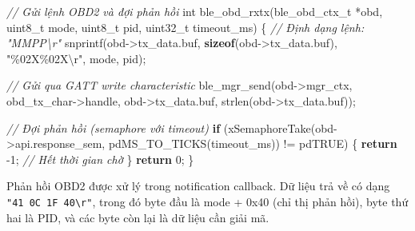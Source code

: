 \documentclass[a4paper]{extarticle}
\newenvironment{Shaded}{}{}
\newcommand{\CommentTok}[1]{\textcolor[rgb]{0.38,0.63,0.69}{\textit{#1}}}
\newcommand{\ControlFlowTok}[1]{\textcolor[rgb]{0.00,0.44,0.13}{\textbf{#1}}}
\newcommand{\DataTypeTok}[1]{\textcolor[rgb]{0.56,0.13,0.00}{#1}}
\newcommand{\DecValTok}[1]{\textcolor[rgb]{0.25,0.63,0.44}{#1}}
\newcommand{\KeywordTok}[1]{\textcolor[rgb]{0.00,0.44,0.13}{\textbf{#1}}}
\newcommand{\NormalTok}[1]{#1}
\newcommand{\OperatorTok}[1]{\textcolor[rgb]{0.40,0.40,0.40}{#1}}
\newcommand{\SpecialCharTok}[1]{\textcolor[rgb]{0.25,0.44,0.63}{#1}}
\newcommand{\StringTok}[1]{\textcolor[rgb]{0.25,0.44,0.63}{#1}}
\begin{document}
\begin{Shaded}
\begin{Highlighting}[]
\CommentTok{// Gửi lệnh OBD2 và đợi phản hồi}
\DataTypeTok{int}\NormalTok{ ble\_obd\_rxtx}\OperatorTok{(}\NormalTok{ble\_obd\_ctx\_t }\OperatorTok{*}\NormalTok{obd}\OperatorTok{,} \DataTypeTok{uint8\_t}\NormalTok{ mode}\OperatorTok{,} \DataTypeTok{uint8\_t}\NormalTok{ pid}\OperatorTok{,}
                 \DataTypeTok{uint32\_t}\NormalTok{ timeout\_ms}\OperatorTok{)}
\OperatorTok{\{}
    \CommentTok{// Định dạng lệnh: "MMPP\textbackslash{}r"}
\NormalTok{    snprintf}\OperatorTok{(}\NormalTok{obd}\OperatorTok{{-}\textgreater{}}\NormalTok{tx\_data}\OperatorTok{.}\NormalTok{buf}\OperatorTok{,} \KeywordTok{sizeof}\OperatorTok{(}\NormalTok{obd}\OperatorTok{{-}\textgreater{}}\NormalTok{tx\_data}\OperatorTok{.}\NormalTok{buf}\OperatorTok{),}
             \StringTok{"}\SpecialCharTok{\%02X\%02X\textbackslash{}r}\StringTok{"}\OperatorTok{,}\NormalTok{ mode}\OperatorTok{,}\NormalTok{ pid}\OperatorTok{);}

    \CommentTok{// Gửi qua GATT write characteristic}
\NormalTok{    ble\_mgr\_send}\OperatorTok{(}\NormalTok{obd}\OperatorTok{{-}\textgreater{}}\NormalTok{mgr\_ctx}\OperatorTok{,}\NormalTok{ obd\_tx\_char}\OperatorTok{{-}\textgreater{}}\NormalTok{handle}\OperatorTok{,}
\NormalTok{                 obd}\OperatorTok{{-}\textgreater{}}\NormalTok{tx\_data}\OperatorTok{.}\NormalTok{buf}\OperatorTok{,}\NormalTok{ strlen}\OperatorTok{(}\NormalTok{obd}\OperatorTok{{-}\textgreater{}}\NormalTok{tx\_data}\OperatorTok{.}\NormalTok{buf}\OperatorTok{));}

    \CommentTok{// Đợi phản hồi (semaphore với timeout)}
    \ControlFlowTok{if} \OperatorTok{(}\NormalTok{xSemaphoreTake}\OperatorTok{(}\NormalTok{obd}\OperatorTok{{-}\textgreater{}}\NormalTok{api}\OperatorTok{.}\NormalTok{response\_sem}\OperatorTok{,}
\NormalTok{                       pdMS\_TO\_TICKS}\OperatorTok{(}\NormalTok{timeout\_ms}\OperatorTok{))} \OperatorTok{!=}\NormalTok{ pdTRUE}\OperatorTok{)} \OperatorTok{\{}
        \ControlFlowTok{return} \OperatorTok{{-}}\DecValTok{1}\OperatorTok{;}  \CommentTok{// Hết thời gian chờ}
    \OperatorTok{\}}
    \ControlFlowTok{return} \DecValTok{0}\OperatorTok{;}
\OperatorTok{\}}
\end{Highlighting}
\end{Shaded}

Phản hồi OBD2 được xử lý trong notification callback. Dữ liệu trả về có
dạng \texttt{"41\ 0C\ 1F\ 40\textbackslash{}r"}, trong đó byte đầu là
mode + 0x40 (chỉ thị phản hồi), byte thứ hai là PID, và các byte còn lại
là dữ liệu cần giải mã.
\end{document}
